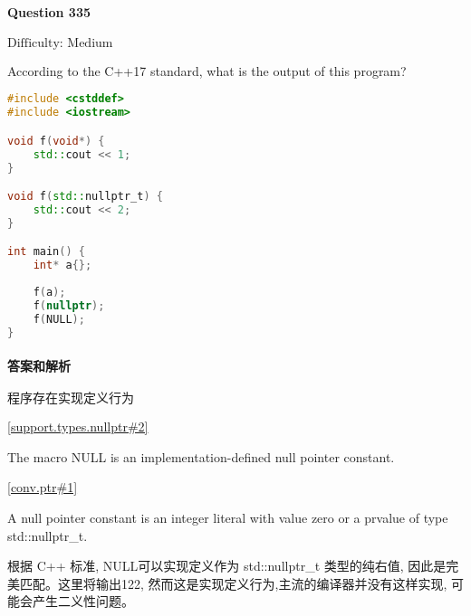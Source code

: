 \documentclass{article}
\begin{document}
	\paragraph*{Question 335} $\boxed{\text{Difficulty: Medium}} $	
	
According to the C++17 standard, what is the output of this program?
	
	\begin{lstlisting}[language=C++]
#include <cstddef>
#include <iostream>

void f(void*) {
	std::cout << 1;
}

void f(std::nullptr_t) {
	std::cout << 2;
}

int main() {
	int* a{};
	
	f(a);
	f(nullptr);
	f(NULL);
}
	\end{lstlisting}
	\paragraph*{答案和解析} $\boxed{\text{程序存在实现定义行为}} $
	
	\href{https://timsong-cpp.github.io/cppwp/n4659/support.types.nullptr#2}{[support.types.nullptr\#2]}
	
	\begin{lightgrayleftbar}
	The macro NULL is an implementation-defined null pointer constant.
	\end{lightgrayleftbar}
	
	\href{https://timsong-cpp.github.io/cppwp/n4659/conv.ptr#1}{[conv.ptr\#1]}
	
	\begin{lightgrayleftbar}
	A null pointer constant is an integer literal with value zero or a prvalue of type std​::​nullptr\_­t.
	\end{lightgrayleftbar}

	根据 C++ 标准, NULL可以实现定义作为 std::nullptr\_t 类型的纯右值, 因此是完美匹配。这里将输出122, 然而这是实现定义行为,主流的编译器并没有这样实现, 可能会产生二义性问题。
\end{document}
